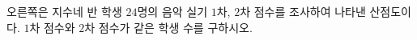 \noindent\begin{minipage}[t]{0.58\linewidth}\vspace{0pt}\raggedright 오른쪽은 지수네 반 학생 $24$명의 음악 실기 $1$차, $2$차 점수를 조사하여 나타낸 산점도이다. $1$차 점수와 $2$차 점수가 같은 학생 수를 구하시오.\end{minipage}\hfill\begin{minipage}[t]{0.4\linewidth}\vspace{0pt}\centering \resizebox{\ifdim\width>\linewidth\linewidth\else\width\fi}{!}{}\end{minipage}\par

